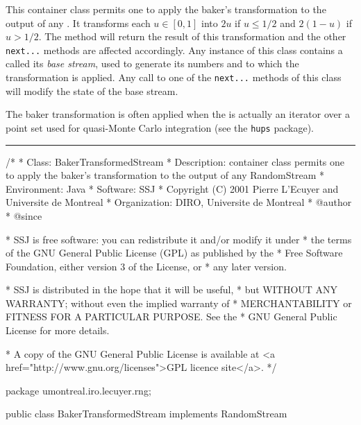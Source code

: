 
This container class permits one to apply the baker's transformation to
the output of any .  
It transforms each $u \in [0,1]$ into $2u$ if $u \le 1/2$ and $2(1-u)$
if $u > 1/2$.
The  method will return the result of this transformation
and the other \texttt{next...} methods are affected accordingly.
Any instance of this class contains a  called its
\emph{base stream}, used to generate its numbers and to which the
transformation is applied. 
Any call to one of the \texttt{next...}
methods of this class will modify the state of the base stream. 

The baker transformation is often applied when the 
is actually an iterator over a point set used for quasi-Monte Carlo
integration (see the \texttt{hups} package).


\bigskip\hrule

\begin{code}
\begin{hide}
/*
 * Class:        BakerTransformedStream
 * Description:  container class permits one to apply the baker's 
                 transformation to the output of any RandomStream
 * Environment:  Java
 * Software:     SSJ 
 * Copyright (C) 2001  Pierre L'Ecuyer and Universite de Montreal
 * Organization: DIRO, Universite de Montreal
 * @author       
 * @since

 * SSJ is free software: you can redistribute it and/or modify it under
 * the terms of the GNU General Public License (GPL) as published by the
 * Free Software Foundation, either version 3 of the License, or
 * any later version.

 * SSJ is distributed in the hope that it will be useful,
 * but WITHOUT ANY WARRANTY; without even the implied warranty of
 * MERCHANTABILITY or FITNESS FOR A PARTICULAR PURPOSE.  See the
 * GNU General Public License for more details.

 * A copy of the GNU General Public License is available at
   <a href="http://www.gnu.org/licenses">GPL licence site</a>.
 */
\end{hide}
package umontreal.iro.lecuyer.rng; 

public class BakerTransformedStream implements RandomStream \begin{hide} {

   // The base stream.
   private RandomStream st;

\end{hide}
\end{code}

